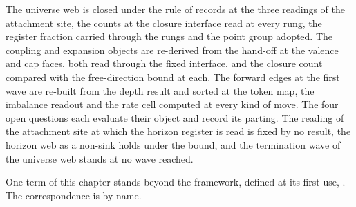 The universe web is closed under the rule of records at the three readings of the attachment site, the counts at the closure interface read at every rung, the register fraction carried through the rungs and the point group adopted. The coupling and expansion objects are re-derived from the hand-off at the valence and cap faces, both read through the fixed interface, and the closure count compared with the free-direction bound at each. The forward edges at the first wave are re-built from the depth result and sorted at the token map, the imbalance readout and the rate cell computed at every kind of move. The four open questions each evaluate their object and record its parting. The reading of the attachment site at which the horizon register is read is fixed by no result, the horizon web as a non-sink holds under the bound, and the termination wave of the universe web stands at no wave reached.
\begin{chbridge}
One term of this chapter stands beyond the framework, defined at its first use, . The correspondence is by name.
\end{chbridge}
